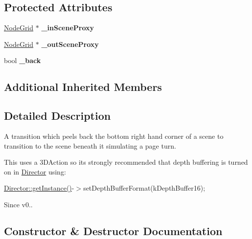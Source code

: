 \subsection*{Protected Attributes}
\begin{DoxyCompactItemize}
\item 
\mbox{\label{classTransitionPageTurn_a8ae13ae088640ef18f0a5a2a7ecf58c8}} 
\hyperlink{classNodeGrid}{Node\+Grid} $\ast$ {\bfseries \+\_\+in\+Scene\+Proxy}
\item 
\mbox{\label{classTransitionPageTurn_a754bf35a8ce812f5b88e352ff715920d}} 
\hyperlink{classNodeGrid}{Node\+Grid} $\ast$ {\bfseries \+\_\+out\+Scene\+Proxy}
\item 
\mbox{\label{classTransitionPageTurn_a4eb29c94dd6efaee129e53697120bb0b}} 
bool {\bfseries \+\_\+back}
\end{DoxyCompactItemize}
\subsection*{Additional Inherited Members}


\subsection{Detailed Description}
A transition which peels back the bottom right hand corner of a scene to transition to the scene beneath it simulating a page turn. 

This uses a 3\+D\+Action so it\textquotesingle{}s strongly recommended that depth buffering is turned on in \hyperlink{classDirector}{Director} using\+:

\hyperlink{classDirector_a8d2a4ca9e20cd400ddadd516efa111e0}{Director\+::get\+Instance()}-\/$>$set\+Depth\+Buffer\+Format(k\+Depth\+Buffer16);

\begin{DoxySince}{Since}
v0.. 
\end{DoxySince}


\subsection{Constructor \& Destructor Documentation}
\mbox{\label{classTransitionPageTurn_a96f393e4df05d5a4c9c97daeeecd58d7}} 
